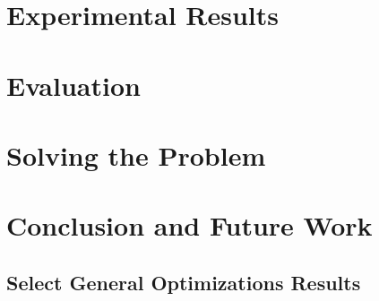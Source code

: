 \documentclass[10pt]{article}
\begin{document}
\section{Experimental Results}


\section{Evaluation}


\section{Solving the Problem}


\section{Conclusion and Future Work}


\pagebreak




\pagebreak
\begin{appendices}

\section{Select General Optimizations Results}
\label{appendix:general-optimizations-results}
%

\end{appendices}
\end{document}
